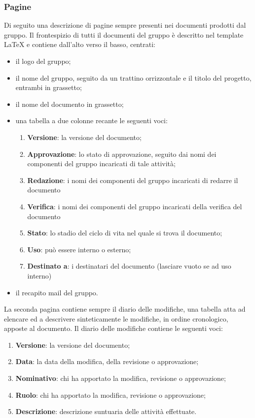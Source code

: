 	    \subsubsection{Pagine}
	    Di seguito una descrizione di pagine sempre presenti nei documenti prodotti dal gruppo.
	    Il frontespizio di tutti il documenti del gruppo è descritto nel template LaTeX e contiene dall'alto verso il basso, centrati:
	    \begin{itemize}
	        \item il logo del gruppo;
	        \item il nome del gruppo, seguito da un trattino orrizzontale e il titolo del progetto, entrambi in grassetto;
	        \item il nome del documento in grassetto;
	        \item una tabella a due colonne recante le seguenti voci:
	        \begin{enumerate}
	            \item \textbf{Versione}: la versione del documento;
	            \item \textbf{Approvazione}: lo stato di approvazione, seguito dai nomi dei componenti del gruppo incaricati di tale attività;
	            \item \textbf{Redazione}: i nomi dei componenti del gruppo incaricati di redarre il documento
	            \item \textbf{Verifica}: i nomi dei componenti del gruppo incaricati della verifica del documento
	            \item \textbf{Stato}: lo stadio del ciclo di vita nel quale si trova il documento;
	            \item \textbf{Uso}: può essere interno o esterno;
	            \item \textbf{Destinato a}: i destinatari del documento (lasciare vuoto se ad uso interno)
	        \end{enumerate}
	        \item il recapito mail del gruppo.
	    \end{itemize}
	    La seconda pagina contiene sempre il diario delle modifiche, una tabella atta ad elencare ed a descrivere sinteticamente le modifiche, in ordine cronologico, apposte al documento.
	    Il diario delle modifiche contiene le seguenti voci:
	    \begin{enumerate}
	        \item \textbf{Versione}: la versione del documento;
	        \item \textbf{Data}: la data della modifica, della revisione o approvazione;
	        \item \textbf{Nominativo}: chi ha apportato la modifica, revisione o approvazione;
	        \item \textbf{Ruolo}: chi ha apportato la modifica, revisione o approvazione;
	        \item \textbf{Descrizione}: descrizione suntuaria delle attività effettuate.
	    \end{enumerate}

